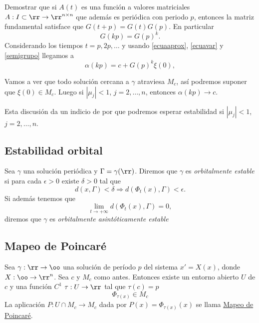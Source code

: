 \begin{ejercicio}
 Demostrar que si $A(t)$ es una función a valores matriciales $A:I\subset\rr\to\rr^{n\times n}$ que además es periódica con periodo $p$,
entonces la matriz fundamental satisface que $G(t+p)=G(t)G(p)$. En particular
\begin{equation}\label{semigrupo}G(kp)=G(p)^k.\end{equation}
Considerando los tiempos $t=p,2p,\ldots$ y usando \eqref{ecuaaprox}, \eqref{ecuavar} y \eqref{semigrupo} llegamos a
\[\alpha(kp)=c+G(p)^k\xi(0),\]
\end{ejercicio}


Vamos a ver que todo solución cercana a $\gamma$ atraviesa $M_c$, así podremos suponer que $\xi(0)\in M_c$. Luego si $|\mu_j|<1$, $j=2,\ldots,n$, 
entonces $\alpha(kp)\to c$. 

Esta discusión da un indicio de por que podremos esperar estabilidad si  $|\mu_j|<1$, $j=2,\ldots,n$.






\subsection{Estabilidad orbital}
\begin{definicion}
  Sea $\gamma$ una solución periódica y $\Gamma=\gamma(\rr)$. Diremos que $\gamma$ es \emph{orbitalmente estable} si para cada $\epsilon>0$ existe $\delta>0$ tal que
 \[d(x,\Gamma)<\delta\Rightarrow d(\Phi_t(x),\Gamma)<\epsilon.\]
 Si además tenemos que
  \[\lim_{t\to +\infty}d(\Phi_t(x),\Gamma)=0,\]
  diremos que $\gamma$ es \emph{orbitalmente asintóticamente estable}
\end{definicion}




\subsection{Mapeo de Poincaré}


\begin{teorema}
 Sea $\gamma:\rr\to\oo$ una solución de período $p$ del sistema $x'=X(x)$, donde $X:\oo\to \rr^n$. Sea $c$ y $M_c$ como antes. Entonces existe un entorno abierto $U$ de $c$ 
 y una función $C^1$ $\tau:U\to \rr$ tal que $\tau(c)=p$
 \[\Phi_{\tau(x)}\in M_c\]
La aplicación $P:U\cap M_c\to M_c$ dada por $P(x)=\Phi_{\tau(x)}(x)$ se llama \href{http://es.wikipedia.org/wiki/Aplicación_de_Poincaré}{Mapeo de Poincaré}.
\end{teorema}

